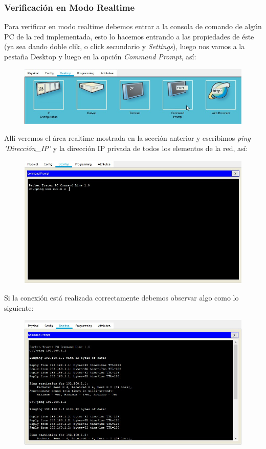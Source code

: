 \documentclass[journal]{IEEEtran}
\begin{document}
	\subsubsection{Verificación en Modo Realtime}
	Para verificar en modo realtime debemos entrar a la consola de comando de algún PC de la red implementada, esto lo hacemos entrando a las propiedades de éste (ya sea dando doble clik, o click secundario y \textit{Settings}), luego nos vamos a la pestaña Desktop y luego en la opción \textit{Command Prompt}, así: \newline
	\begin{figure}[ht]
		\centering
		\includegraphics[scale=0.33]{pt_ver_realtime.jpg}
	\end{figure}

	\newpage

	Allí veremos el área realtime mostrada en la sección anterior y escribimos \textit{ping 'Dirección\_IP'} y la dirección IP privada de todos los elementos de la red, así:\newline
	\begin{figure}[ht]
		\centering
		\includegraphics[scale=0.27]{pt_ver_ping1.jpg}
	\end{figure}
	
	Si la conexión está realizada correctamente debemos observar algo como lo siguiente:
	\begin{figure}[ht]
		\centering
		\includegraphics[scale=0.27]{pt_ver_ping2.jpg}
	\end{figure}
\end{document}
